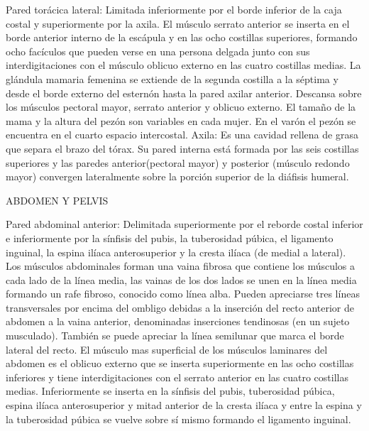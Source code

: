 \documentclass[a4paper,12pt]{article} %
\begin{document}
Pared torácica lateral: Limitada inferiormente por el borde inferior de la caja costal y superiormente por la axila.
El músculo serrato anterior se inserta en el borde anterior interno de la escápula y en las ocho costillas superiores, formando ocho facículos que pueden verse en una persona delgada junto con sus interdigitaciones con el músculo oblicuo externo en las cuatro costillas medias.
La glándula mamaria femenina se extiende de la segunda costilla a la séptima y desde el borde externo del esternón hasta la pared axilar anterior. Descansa sobre los músculos  pectoral mayor, serrato anterior y oblicuo externo. El tamaño de la mama y la altura del pezón son variables en cada mujer. En el varón el pezón se encuentra en el cuarto espacio intercostal.
Axila: Es una cavidad rellena de grasa que separa el brazo del tórax. Su pared interna está formada por las seis costillas superiores y las paredes anterior(pectoral mayor) y posterior (músculo redondo mayor) convergen lateralmente sobre la porción superior de la diáfisis humeral.


ABDOMEN Y PELVIS

Pared abdominal anterior: Delimitada superiormente por el reborde costal inferior e inferiormente por la sínfisis del pubis, la tuberosidad púbica, el ligamento inguinal, la espina ilíaca anterosuperior y la cresta ilíaca (de medial a lateral). Los músculos abdominales forman una vaina fibrosa que contiene los músculos a cada lado de la línea media, las vainas de los dos lados se unen en la línea media formando un rafe fibroso, conocido como línea alba. Pueden apreciarse tres líneas transversales por encima del ombligo debidas a la inserción del recto anterior de abdomen a la vaina anterior, denominadas inserciones tendinosas (en un sujeto musculado). También se puede apreciar la línea semilunar que marca el borde lateral del recto. El músculo mas superficial de los músculos laminares del abdomen es el oblicuo externo que se inserta superiormente en las ocho costillas inferiores y tiene interdigitaciones con el serrato anterior en las cuatro costillas medias. Inferiormente se inserta en la sínfisis del pubis, tuberosidad púbica, espina ilíaca anterosuperior y mitad anterior de la cresta ilíaca y entre la espina y la tuberosidad púbica se vuelve sobre sí mismo formando el ligamento inguinal.
\end{document}
